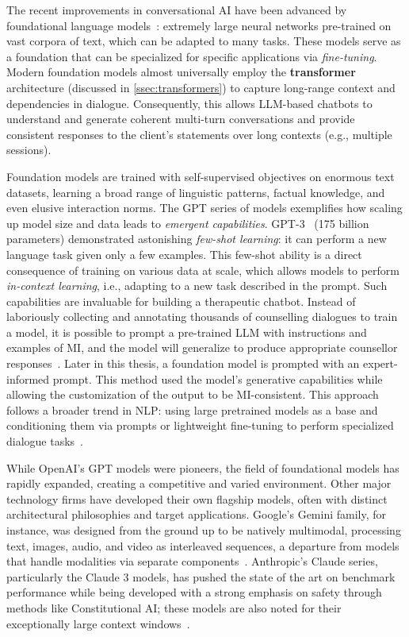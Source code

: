 The recent improvements in conversational AI have been advanced by foundational language models~\cite{stanfordCRFM2021}: extremely large neural networks pre-trained on vast corpora of text, which can be adapted to many tasks. These models serve as a foundation that can be specialized for specific applications via \emph{fine-tuning}. Modern foundation models almost universally employ the \textbf{transformer} architecture (discussed in \cref{ssec:transformers}) to capture long-range context and dependencies in dialogue. Consequently, this allows LLM-based chatbots to understand and generate coherent multi-turn conversations and provide consistent responses to the client's statements over long contexts (e.g., multiple sessions).

Foundation models are trained with self-supervised objectives on enormous text datasets, learning a broad range of linguistic patterns, factual knowledge, and even elusive interaction norms. The GPT series of models exemplifies how scaling up model size and data leads to \emph{emergent capabilities}. GPT-3~\cite{brown2020language} (175 billion parameters) demonstrated astonishing \emph{few-shot learning}: it can perform a new language task given only a few examples. This few-shot ability is a direct consequence of training on various data at scale, which allows models to perform \emph{in-context learning}, i.e., adapting to a new task described in the prompt. Such capabilities are invaluable for building a therapeutic chatbot. Instead of laboriously collecting and annotating thousands of counselling dialogues to train a model, it is possible to prompt a pre-trained LLM with instructions and examples of MI, and the model will generalize to produce appropriate counsellor responses~\cite{xie-etal-2024-shot-dialogue}. Later in this thesis, a foundation model is prompted with an expert-informed prompt. This method used the model's generative capabilities while allowing the customization of the output to be MI-consistent. This approach follows a broader trend in NLP: using large pretrained models as a base and conditioning them via prompts or lightweight fine-tuning to perform specialized dialogue tasks~\cite{10.5555/3600270.3602070}.

While OpenAI's GPT models were pioneers, the field of foundational models has rapidly expanded, creating a competitive and varied environment. Other major technology firms have developed their own flagship models, often with distinct architectural philosophies and target applications. Google's Gemini family, for instance, was designed from the ground up to be natively multimodal, processing text, images, audio, and video as interleaved sequences, a departure from models that handle modalities via separate components~\cite{team2023gemini}. Anthropic's Claude series, particularly the Claude 3 models, has pushed the state of the art on benchmark performance while being developed with a strong emphasis on safety through methods like Constitutional AI; these models are also noted for their exceptionally large context windows~\cite{anthropic2024claude}.

